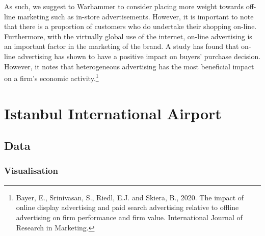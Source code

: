 \documentclass[11pt]{article}
\begin{document}
As such, we suggest to Warhammer to consider placing more weight towards off-line marketing such as in-store advertisements. However, it is important to note that there is a proportion of customers who do undertake their shopping on-line. Furthermore, with the virtually global use of the internet, on-line advertising is an important factor in the marketing of the brand. A study has found that on-line advertising has shown to have a positive impact on buyers' purchase decision. However, it notes that heterogeneous advertising has the most beneficial impact on a firm's economic activity.\footnote{Bayer, E., Srinivasan, S., Riedl, E.J. and Skiera, B., 2020. The impact of online display advertising and paid search advertising relative to offline advertising on firm performance and firm value. International Journal of Research in Marketing.}

\newpage\section{Istanbul International Airport}
\subsection{Data}
\subsubsection{Visualisation}
\begin{figure}[h!]
\centering 
{}\end{figure}
\end{document}
